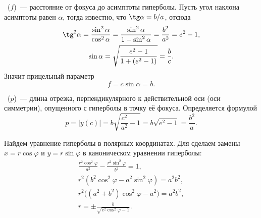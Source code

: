 ~($f$)~--- расстояние от фокуса до асимптоты гиперболы. Пусть угол наклона асимптоты равен $\alpha$, тогда известно, что $\tg \alpha = b/a$, отсюда
\begin{gather*}
	\tg^2 \alpha = \frac{\sin^2 \alpha}{\cos^2 \alpha} = \frac{\sin^2 \alpha}{1 - \sin^2 \alpha} = \frac{b^2}{a^2} = e^2 - 1,\\
	\sin \alpha =\sqrt{\frac{e^2 - 1}{1 + (e^2 - 1)}} = \frac{b}{c}.
\end{gather*}
Значит прицельный параметр
\begin{equation}
	f = c \sin \alpha = b.
\end{equation}

~($p$)~--- длина отрезка, перпендикулярного к действительной оси (оси симметрии), опущенного с гиперболы в точку её фокуса. Определяется формулой
\begin{equation}
	p= |y(c)| = b\sqrt{\frac{c^2}{a^2} - 1} = b \sqrt{e^2 - 1} = \frac{b^2}{a}.
\end{equation}

Найдем уравнение гиперболы в полярных координатах. Для сделаем замены $x = r \cos \varphi$ и $y = r \sin \varphi$ в каноническом уравнении гиперболы:
\begin{gather*}
	\frac{r^2 \cos^2 \varphi}{a^2} - \frac{r^2 \sin^2 \varphi}{b^2} = 1,\\
	r^2 ( b^2 \cos^2 \varphi - a^2 \sin^2 \varphi) = a^2 b^2,\\
	r^2 \big( (a^2 + b^2) \cos^2 \varphi - a^2 \big) = a^2 b^2,\\
	r = \pm\frac{b}{\sqrt{e^2 \cos^2 \varphi - 1}}.
\end{gather*}

